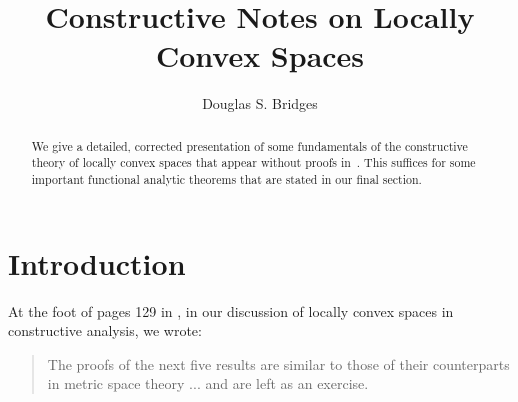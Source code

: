 \documentclass{article}%
\begin{document}
\title{\textsf{Constructive Notes on Locally Convex Spaces}}
\author{\textsf{Douglas S. Bridges}}
\maketitle

\begin{abstract}%
\noindent
\textsf{We give a detailed, corrected presentation of some fundamentals of the
constructive theory of locally convex spaces that appear without proofs
in\ \cite[Section 5.4]{BVtech}. This suffices for some important functional
analytic theorems that are stated in our final section.}

\end{abstract}

%

\normalfont\sf
%

\bigskip
%

\bigskip
%

\bigskip


\section{Introduction}

At the foot of pages 129 in \cite{BVtech}, in our discussion of locally convex
spaces in constructive analysis, we wrote:

\begin{quote}
The proofs of the next five results are similar to those of their counterparts
in metric space theory ... and are left as an exercise.
\end{quote}

%
\end{document}
